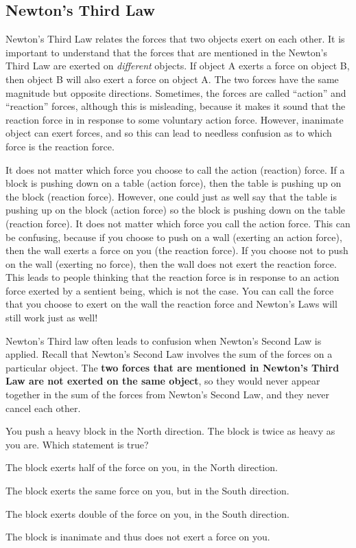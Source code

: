 \subsection{Newton's Third Law}
Newton's Third Law relates the forces that two objects exert on each other. It is important to understand that the forces that are mentioned in the Newton's Third Law are exerted on \textit{different} objects. If object A exerts a force on object B, then object B will also exert a force on object A. The two forces have the same magnitude but opposite directions. Sometimes, the forces are called ``action'' and ``reaction'' forces, although this is misleading, because it makes it sound that the reaction force in in response to some voluntary action force. However, inanimate object can exert forces, and so this can lead to needless confusion as to which force is the reaction force.

It does not matter which force you choose to call the action (reaction) force. If a block is pushing down on a table (action force), then the table is pushing up on the block (reaction force). However, one could just as well say that the table is pushing up on the block (action force) so the block is pushing down on the table (reaction force). It does not matter which force you call the action force. This can be confusing, because if you choose to push on a wall (exerting an action force), then the wall exerts a force on you (the reaction force). If you choose not to push on the wall (exerting no force), then the wall does not exert the reaction force. This leads to people thinking that the reaction force is in response to an action force exerted by a sentient being, which is not the case. You can call the force that you choose to exert on the wall the reaction force and Newton's Laws will still work just as well!

Newton's Third law often leads to confusion when Newton's Second Law is applied. Recall that Newton's Second Law involves the sum of the forces on a particular object. The \textbf{two forces that are mentioned in Newton's Third Law are not exerted on the same object}, so they would never appear together in the sum of the forces from Newton's Second Law, and they never cancel each other. 

\begin{checkpointMC}{You push a heavy block in the North direction. The block is twice as heavy as you are. Which statement is true?}
\item The block exerts half of the force on you, in the North direction.
\item The block exerts the same force on you, but in the South direction. %
\item The block exerts double of the force on you, in the South direction.
\item The block is inanimate and thus does not exert a force on you. 
\end{checkpointMC}

